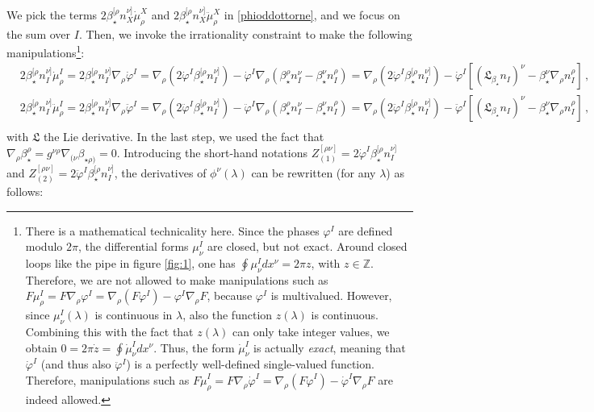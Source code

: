 \documentclass[a4paper, amsfonts, amssymb, amsmath, reprint, showkeys, nofootinbib, twoside,notitlepage,onecolumn]{revtex4-2}
\theoremstyle{definition}
\theoremstyle{theorem}
\theoremstyle{corollary}
\begin{document}
We pick the terms $2 \beta^{[\rho}_\star n^{\nu]}_X \dot{\mu}^X_\rho$ and $2 \beta^{[\rho}_\star n^{\nu]}_X \ddot{\mu}^X_\rho$ in \eqref{phioddottorne}, and we focus on the sum over $I$. Then, we invoke the irrationality constraint to make the following manipulations\footnote{There is a mathematical technicality here. Since the phases $\varphi^I$ are defined modulo $2\pi$, the differential forms $\mu^I_\nu$ are closed, but not exact. Around closed loops like the pipe in figure \ref{fig:1}, one has $\oint \mu^I_\nu dx^\nu =2\pi z$, with $z\in \mathbb{Z}$. Therefore, we are not allowed to make manipulations such as $F\mu^I_\rho=F \nabla_\rho \varphi^I=\nabla_\rho (F\varphi^I)-\varphi^I \nabla_\rho F$, because $\varphi^I$ is multivalued. However, since $\mu^I_\nu (\lambda)$ is continuous in $\lambda$, also the function $z(\lambda)$ is continuous. Combining this with the fact that $z(\lambda)$ can only take integer values, we obtain $0=2\pi \dot{z}=\oint \dot{\mu}^I_\nu dx^\nu$. Thus, the form $\dot{\mu}^I_\nu$ is actually \textit{exact}, meaning that $\dot{\varphi}^I$ (and thus also $\ddot{\varphi}^I$) is a perfectly well-defined single-valued function. Therefore, manipulations such as $F\dot{\mu}^I_\rho =F \nabla_\rho \dot{\varphi}^I=\nabla_\rho (F\dot{\varphi}^I)-\dot{\varphi}^I \nabla_\rho F$ are indeed allowed.}:
\begin{equation}\label{irrez}
\begin{split}
& 2 \beta^{[\rho}_\star n^{\nu]}_I \dot{\mu}^I_\rho =2 \beta^{[\rho}_\star n^{\nu]}_I \nabla_\rho \dot{\varphi}^I =\nabla_\rho (2\dot{\varphi}^I\beta^{[\rho}_\star n^{\nu]}_I)-\dot{\varphi}^I \nabla_{\rho}(\beta^{\rho}_\star n^{\nu}_I{-}\beta^{\nu}_\star n^{\rho}_I)=\nabla_\rho (2\dot{\varphi}^I\beta^{[\rho}_\star n^{\nu]}_I){-}\dot{\varphi}^I[(\mathfrak{L}_{\beta_\star} n_I)^\nu-\beta_\star^\nu \nabla_\rho n_I^\rho ] \, , \\
& 2 \beta^{[\rho}_\star n^{\nu]}_I \ddot{\mu}^I_\rho =2 \beta^{[\rho}_\star n^{\nu]}_I \nabla_\rho \ddot{\varphi}^I =\nabla_\rho (2\ddot{\varphi}^I\beta^{[\rho}_\star n^{\nu]}_I)-\ddot{\varphi}^I \nabla_{\rho}(\beta^{\rho}_\star n^{\nu}_I{-}\beta^{\nu}_\star n^{\rho}_I)=\nabla_\rho (2\ddot{\varphi}^I\beta^{[\rho}_\star n^{\nu]}_I){-}\ddot{\varphi}^I[(\mathfrak{L}_{\beta_\star} n_I)^\nu-\beta_\star^\nu \nabla_\rho n_I^\rho ]\, ,\\
\end{split}
\end{equation}
with $\mathfrak{L}$ the Lie derivative. In the last step, we used the fact that $\nabla_\rho \beta_\star^\rho=g^{\nu \rho}\nabla_{(\nu}\beta_{\star \rho)}=0$. Introducing the short-hand notations $Z_{(1)}^{[\rho \nu]}=2\dot{\varphi}^I\beta^{[\rho}_\star n^{\nu]}_I$ and $Z_{(2)}^{[\rho \nu]}=2\ddot{\varphi}^I\beta^{[\rho}_\star n^{\nu]}_I$, the derivatives of $\phi^\nu(\lambda)$ can be rewritten (for any $\lambda$) as follows:
\end{document}
